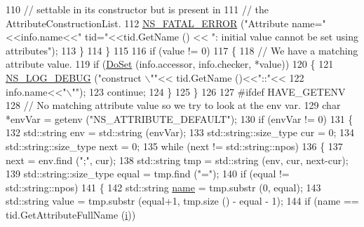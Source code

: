 \begin{DoxyCode}
110                   \textcolor{comment}{// settable in its constructor but is present in}
111                   \textcolor{comment}{// the AttributeConstructionList.}
112                   \hyperlink{group__fatal_ga5131d5e3f75d7d4cbfd706ac456fdc85}{NS\_FATAL\_ERROR} (\textcolor{stringliteral}{"Attribute name="}<<info.name<<\textcolor{stringliteral}{" tid="}<<tid.GetName () << \textcolor{stringliteral}{":
       initial value cannot be set using attributes"});
113                 \}
114             \}
115 
116           \textcolor{keywordflow}{if} (value != 0)
117             \{
118               \textcolor{comment}{// We have a matching attribute value.}
119               \textcolor{keywordflow}{if} (\hyperlink{classns3_1_1ObjectBase_afe5f2f7b2fabc99aa33f9bb434e3b695}{DoSet} (info.accessor, info.checker, *value))
120                 \{
121                   \hyperlink{group__logging_ga413f1886406d49f59a6a0a89b77b4d0a}{NS\_LOG\_DEBUG} (\textcolor{stringliteral}{"construct \(\backslash\)""}<< tid.GetName ()<<\textcolor{stringliteral}{"::"}<<
122                                 info.name<<\textcolor{stringliteral}{"\(\backslash\)""});
123                   \textcolor{keywordflow}{continue};
124                 \}
125             \}
126 
127 \textcolor{preprocessor}{#ifdef HAVE\_GETENV}
128           \textcolor{comment}{// No matching attribute value so we try to look at the env var.}
129           \textcolor{keywordtype}{char} *envVar = getenv (\textcolor{stringliteral}{"NS\_ATTRIBUTE\_DEFAULT"});
130           \textcolor{keywordflow}{if} (envVar != 0)
131             \{
132               std::string env = std::string (envVar);
133               std::string::size\_type cur = 0;
134               std::string::size\_type next = 0;
135               \textcolor{keywordflow}{while} (next != std::string::npos)
136                 \{
137                   next = env.find (\textcolor{stringliteral}{";"}, cur);
138                   std::string tmp = std::string (env, cur, next-cur);
139                   std::string::size\_type equal = tmp.find (\textcolor{stringliteral}{"="});
140                   \textcolor{keywordflow}{if} (equal != std::string::npos)
141                     \{
142                       std::string \hyperlink{generate__test__data__lte__spectrum__model_8m_ab74e6bf80237ddc4109968cedc58c151}{name} = tmp.substr (0, equal);
143                       std::string value = tmp.substr (equal+1, tmp.size () - equal - 1);
144                       \textcolor{keywordflow}{if} (name == tid.GetAttributeFullName (\hyperlink{bernuolliDistribution_8m_a6f6ccfcf58b31cb6412107d9d5281426}{i}))

\end{DoxyCode}
